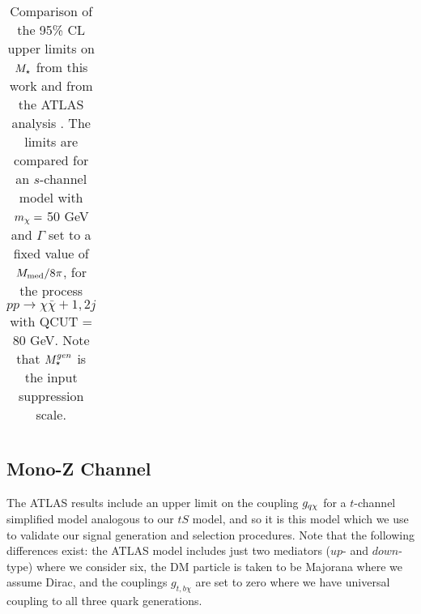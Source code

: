 \begin{table}[!htbp]
\begin{tabular}{c|c|c|c}
 \hline
 \hline
\end{tabular}
\caption{Comparison of the 95\% CL upper limits on $M_{\star}$ from this work and from the ATLAS \monojet analysis \cite{Aad:2015zva}. The limits are compared for an $s$-channel model with $m_{\chi} = $ 50 GeV and $\Gamma$ set to a fixed value of $M_{\mathrm{med}}/8\pi$, for the process $pp \rightarrow \chi \bar{\chi} + 1, 2j$ with QCUT = 80 GeV. Note that $M_{\star}^{\tiny gen}$ is the input suppression scale.}
\label{M_star_limits_monojet}
\end{table}

\subsection{Mono-Z Channel}
\label{monoZ_validation}

The ATLAS \monoZ results include an upper limit on the coupling $g_{q \chi}$ for a $t$-channel simplified model analogous to our $tS$ model, and so it is this model which we use to validate our signal generation and selection procedures. Note that the following differences exist: the ATLAS model includes just two mediators ($up$- and $down$-type) where we consider six, the DM particle is taken to be Majorana where we assume Dirac, and the couplings $g_{t,b \chi}$ are set to zero where we have universal coupling to all three quark generations.

